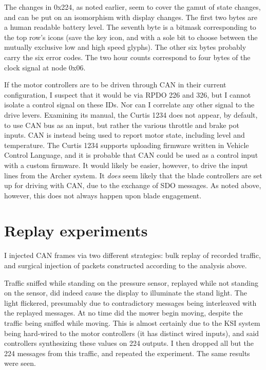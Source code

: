 \documentclass[letterpaper,10pt]{article}
\begin{document}
The changes in 0x224, as noted earlier, seem to cover the gamut of state
changes, and can be put on an isomorphism with display changes.  The first
two bytes are a human readable battery level. The seventh byte is a bitmask
corresponding to the top row's icons (save the key icon, and with a sole bit
to choose between the mutually exclusive low and high speed glyphs). The other
six bytes probably carry the six error codes. The two hour counts correspond
to four bytes of the clock signal at node 0x06.

If the motor controllers are to be driven through CAN in their current
configuration, I suspect that it would be via RPDO 226 and 326, but I cannot
isolate a control signal on these IDs. Nor can I correlate any other signal
to the drive levers. Examining its manual, the Curtis 1234 does not appear, by
default, to use CAN bus as an input, but rather the various throttle and brake
pot inputs. CAN is instead being used to report motor state, including level
and temperature. The Curtis 1234 supports uploading firmware written in 
Vehicle Control Language, and it is probable that CAN could be used as a control
input with a custom firmware. It would likely be easier, however, to drive the
input lines from the Archer system. It \textit{does} seem likely that the
blade controllers are set up for driving with CAN, due to the exchange of SDO
messages. As noted above, however, this does not always happen upon blade
engagement.

\section{Replay experiments}
I injected CAN frames via two different strategies: bulk replay of recorded
traffic, and surgical injection of packets constructed according to the analysis
above.

Traffic sniffed while standing on the pressure sensor, replayed while not
standing on the sensor, did indeed cause the display to illuminate the stand
light. The light flickered, presumably due to contradictory messages being
interleaved with the replayed messages. At no time did the mower begin moving,
despite the traffic being sniffed while moving. This is almost certainly due
to the KSI system being hard-wired to the motor controllers (it has distinct
wired inputs), and said controllers synthesizing these values on 224 outputs.
I then dropped all but the 224 messages from this traffic, and repeated the
experiment. The same results were seen.
\end{document}
